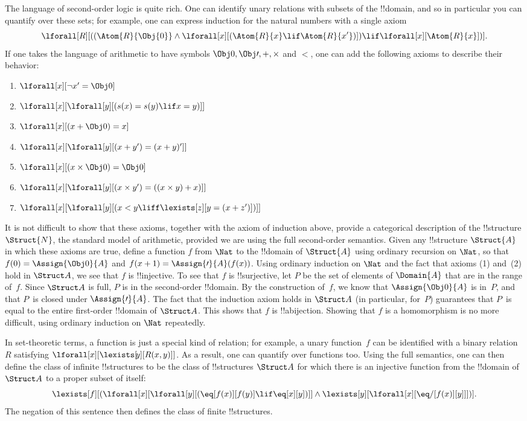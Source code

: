 \documentclass[../../../include/open-logic-section]{subfiles}
\begin{document}
The language of second-order logic is quite rich. One can identify
unary relations with subsets of the !!{domain}, and so in particular you
can quantify over these sets; for example, one can express induction
for the natural numbers with a single axiom
\[
\lforall[R][((\Atom{R}{\Obj{0}} \land \lforall[x][(\Atom{R}{x} \lif
    \Atom{R}{x'})]) \lif \lforall[x][\Atom{R}{x}])].
\]
If one takes the language of arithmetic to have symbols $\Obj 0, \Obj \prime, +,
\times$ and $<$, one can add the following axioms to describe their
behavior:
\begin{enumerate}
\item $\lforall[x][\lnot x' = \Obj 0]$
\item $\lforall[x][\lforall[y][(s(x) = s(y) \lif x = y)]]$
\item $\lforall[x][(x + \Obj 0) = x]$
\item $\lforall[x][\lforall[y][(x + y') = (x + y)']]$
\item $\lforall[x][(x \times \Obj 0) = \Obj 0]$
\item $\lforall[x][\lforall[y][(x \times y') = ((x \times y) + x)]]$
\item $\lforall[x][\lforall[y][(x < y \liff \lexists[z][y = (x + z')])]]$
\end{enumerate}
It is not difficult to show that these axioms, together with the axiom
of induction above, provide a categorical description of the
!!{structure} $\Struct{N}$, the standard model of arithmetic, provided
we are using the full second-order semantics. Given any !!{structure}
$\Struct{A}$ in which these axioms are true, define a function $f$
from $\Nat$ to the !!{domain} of $\Struct{A}$ using ordinary recursion
on $\Nat$, so that $f(0) = \Assign{\Obj 0}{A}$ and $f(x+1) =
\Assign{\prime}{A}(f(x))$. Using ordinary induction on $\Nat$ and the
fact that axioms (1) and~(2) hold in $\Struct A$, we see that $f$ is
!!{injective}. To see that $f$ is !!{surjective}, let $P$ be the set
of elements of $\Domain{A}$ that are in the range of~$f$. Since
$\Struct A$ is full, $P$ is in the second-order !!{domain}. By the
construction of~$f$, we know that $\Assign{\Obj 0}{A}$ is in~$P$, and
that $P$~is closed under $\Assign{\prime}{A}$. The fact that the
induction axiom holds in $\Struct A$ (in particular, for~$P$)
guarantees that $P$~is equal to the entire first-order !!{domain} of
$\Struct A$. This shows that $f$ is !!a{bijection}. Showing that $f$ is a
homomorphism is no more difficult, using ordinary induction on
$\Nat$ repeatedly.

In set-theoretic terms, a function is just a special kind of relation;
for example, a unary function~$f$ can be identified with a binary
relation~$R$ satisfying $\lforall[x][\lexists[\! y][R(x,y)]]$. As a result, one
can quantify over functions too. Using the full semantics, one can
then define the class of infinite !!{structure}s to be the class of
!!{structure}s $\Struct A$ for which there is an injective function from the
!!{domain} of $\Struct A$ to a proper subset of itself:
\[
\lexists[f][(\lforall[x][\lforall[y][(\eq[f(x)][f(y)] \lif \eq[x][y])]]
  \land \lexists[y][\lforall[x][\eq/[f(x)][y]]])].
\]
The negation of this sentence then defines the class of finite
!!{structure}s.
\end{document}
